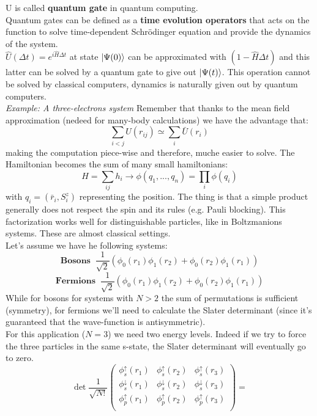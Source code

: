 U is called \textbf{quantum gate} in quantum computing.\\
Quantum gates can be defined as a \textbf{time evolution operators} that acts on the function to solve time-dependent Schr\"odinger equation and provide the dynamics of the system.\\
$\hat{U}(\Delta t) = e^{i\hat{H}\Delta t}$ at state $\ket{\Psi(0)}$ can be approximated with $(1-\hat{H}\Delta t)$ and this latter can be solved by a quantum gate to give out $\ket{\Psi(t)}$. This operation cannot be solved by classical computers, dynamics is naturally given out by quantum computers.\\

\textit{Example: A three-electrons system}
Remember that thanks to the mean field approximation (nedeed for many-body calculations) we have the advantage that:
\[
\sum_{i<j} U(r_{ij}) \simeq \sum_i \bar{U}(r_i)
\]
making the computation piece-wise and therefore, muche easier to solve.
The Hamiltonian becomes the sum of many small hamiltonians:
\[
H = \sum_{ij} h_i \rightarrow \phi(q_1, ... , q_n) = \prod_i \phi(q_i)
\]
with $q_i = (\bar{r}_i, S^z_i)$ representing the position. The thing is that a simple product generally does not respect the spin and its rules (e.g. Pauli blocking). This factorization works well for distinguishable particles, like in Boltzmanions systems. These are almost classical settings. \\
Let's assume we have he following systems:
\[
\textbf{Bosons} \;\; \frac{1}{\sqrt{2}}(\phi_0(r_1)\phi_1(r_2) + \phi_0(r_2)\phi_1(r_1))
\]
\[
\textbf{Fermions} \;\; \frac{1}{\sqrt{2}}(\phi_0(r_1)\phi_1(r_2) + \phi_0(r_2)\phi_1(r_1))
\]
While for bosons for systems with $N>2$ the sum of permutations is sufficient (symmetry), for fermions we'll need to calculate the Slater determinant (since it's guaranteed that the wave-function is antisymmetric). \\
For this application ($N = 3 $) we need two energy levels. Indeed if we try to force the three particles in the same s-state, the Slater determinant will eventually go to zero.\\
\[
\det\frac{1}{\sqrt{N!}}
\begin{pmatrix}
\phi_s^\uparrow(r_1)&\phi_s^\uparrow(r_2)&\phi_s^\uparrow(r_3)\\
\phi_s^\downarrow(r_1)&\phi_s^\downarrow(r_2)&\phi_s^\downarrow(r_3)\\
\phi_p^\uparrow(r_1)&\phi_p^\uparrow(r_2)&\phi_p^\uparrow(r_3)\\
\end{pmatrix}=
\]
